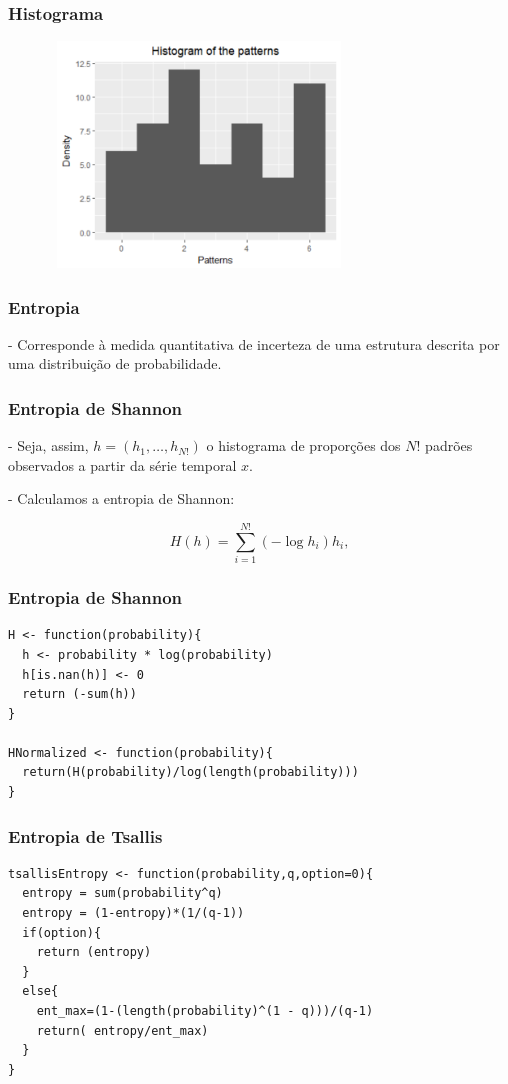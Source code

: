 \documentclass[10pt, compress]{beamer}
\begin{document}
\begin{frame}[fragile]
\frametitle{Histograma}

\begin{figure}
  \centering
   \includegraphics[width=8cm,height=6cm]{Rplot02.pdf}
\end{figure}
\end{frame}

\begin{frame}[fragile]
\frametitle{Entropia}

- Corresponde à medida quantitativa  de incerteza  de uma estrutura descrita por uma distribuição de probabilidade.

\end{frame}

\begin{frame}[fragile]
\frametitle{Entropia de Shannon}

- Seja, assim, $h=(h_1,\dots,h_{N!})$ o histograma de proporções dos $N!$ padrões observados a partir da série temporal $x$.

- Calculamos a entropia de Shannon:

\begin{equation}
 H(h) = \sum_{i=1}^{N!} (-\log h_i) h_i ,
\label{eq:Entropia}
\end{equation}

\end{frame}

\begin{frame}[fragile]
\frametitle{Entropia de Shannon}
 \begin{lstlisting}
H <- function(probability){
  h <- probability * log(probability)
  h[is.nan(h)] <- 0
  return (-sum(h))
}

HNormalized <- function(probability){
  return(H(probability)/log(length(probability)))
}
\end{lstlisting}
\end{frame}


\begin{frame}[fragile]
\frametitle{Entropia de Tsallis}
 \begin{lstlisting}
tsallisEntropy <- function(probability,q,option=0){  
  entropy = sum(probability^q)
  entropy = (1-entropy)*(1/(q-1))
  if(option){
    return (entropy)
  }
  else{
    ent_max=(1-(length(probability)^(1 - q)))/(q-1)
    return( entropy/ent_max)
  }
}
\end{lstlisting}
\end{frame}
\end{document}
